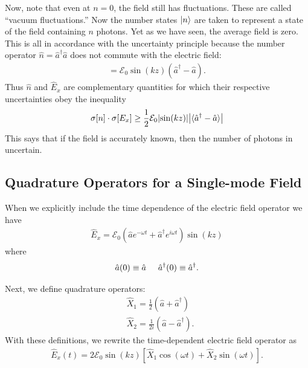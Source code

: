 \documentclass{book}
\theoremstyle{definition}
\newcommand{\f}[2]{\frac{#1}{#2}}
\begin{document}
Now, note that even at $n=0$, the field still has fluctuations. These are called ``vacuum fluctuations.'' Now the number states $\ket{n}$ are taken to represent a state of the field containing $n$ photons. Yet as we have seen, the average field is zero. This is all in accordance with the uncertainty principle because the number operator $\hat{n} = \hat{a}^\dagger\hat{a}$ does not commute with the electric field:
\begin{align}
[\hat{n}, \hat{E}_x] = \mathcal{E}_0 \sin(kz)(\hat{a}^\dagger - \hat{a}).
\end{align}
Thus $\hat{n}$ and $\hat{E}_x$ are complementary quantities for which their respective uncertainties obey the inequality
\begin{align}
\sigma[ n ]\cdot \sigma[ E_x ]\geq \f{1}{2}\mathcal{E}_0\abs{\sin(kz)}\abs{\langle \hat{a}^\dagger - \hat{a}\rangle}
\end{align}
This says that if the field is accurately known, then the number of photons in uncertain. 



\subsection{Quadrature Operators for a Single-mode Field}

When we explicitly include the time dependence of the electric field operator we have
\begin{align}
\hat{E}_x = \mathcal{E}_0 (\hat{a}e^{-\omega t} + \hat{a}^\dagger e^{i\omega t})\sin(kz)
\end{align}
where
\begin{align}
\hat{a}(0) \equiv \hat{a} \hspace{0.5cm} \hat{a}^\dagger(0) \equiv \hat{a}^\dagger.
\end{align}

Next, we define quadrature operators:
\begin{align}
&\hat{X}_1 = \f{1}{2}(\hat{a} + \hat{a}^\dagger)\\
&\hat{X}_2 = \f{1}{2i}(\hat{a} - \hat{a}^\dagger).
\end{align}
With these definitions, we rewrite the time-dependent electric field operator as
\begin{align}
\hat{E}_x(t) = 2\mathcal{E}_0\sin(kz)[\hat{X}_1 \cos(\omega t) + \hat{X}_2\sin(\omega t)].
\end{align}
\end{document}
